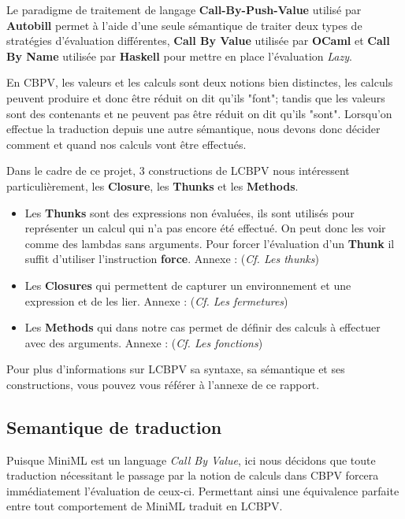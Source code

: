 \documentclass[12pt]{article}
\begin{document}
Le paradigme de traitement de langage \textbf{Call-By-Push-Value}
utilisé par \textbf{Autobill} permet à l'aide d'une seule sémantique de
traiter deux types de stratégies d'évaluation différentes, \textbf{Call
      By Value} utilisée par \textbf{OCaml} et \textbf{Call By Name} utilisée
par \textbf{Haskell} pour mettre en place l'évaluation \emph{Lazy}.

En CBPV, les valeurs et les calculs sont deux notions bien distinctes, les calculs peuvent produire et donc être réduit on dit qu'ils "font";
tandis que les valeurs sont des contenants et ne peuvent pas être réduit on dit qu'ils "sont".
Lorsqu'on effectue la traduction depuis une autre sémantique, nous devons donc décider comment et quand nos calculs vont être effectués.

Dans le cadre de ce projet, 3 constructions de LCBPV nous intéressent particulièrement, les \textbf{Closure}, les \textbf{Thunks} et les \textbf{Methods}.
\begin{itemize}
      \item
            Les \textbf{Thunks} sont des expressions non évaluées, ils sont utilisés pour représenter un calcul qui n'a pas encore été effectué.
            On peut donc les voir comme des lambdas sans arguments.
            Pour forcer l'évaluation d'un \textbf{Thunk} il suffit d'utiliser l'instruction  \textbf{force}.
            Annexe : (\textit{Cf. Les thunks})
      \item
            Les \textbf{Closures} qui permettent de capturer un environnement et une expression et de les lier.
            Annexe : (\textit{Cf. Les fermetures})
      \item
            Les \textbf{Methods} qui dans notre cas permet de définir des calculs à effectuer avec des arguments.
            Annexe : (\textit{Cf. Les fonctions})
\end{itemize}
Pour plus d'informations sur LCBPV sa syntaxe, sa sémantique et ses constructions, vous pouvez vous référer à l'annexe de ce rapport.

\hypertarget{semantique-de-traduction}{%
      \subsection{Semantique de traduction}\label{semantique-de-traduction}}

Puisque MiniML est un language \emph{Call By Value}, ici nous décidons que toute traduction nécessitant le passage par la notion de calculs dans CBPV forcera immédiatement l'évaluation de ceux-ci.
Permettant ainsi une équivalence parfaite entre tout comportement de MiniML traduit en LCBPV.
\end{document}
